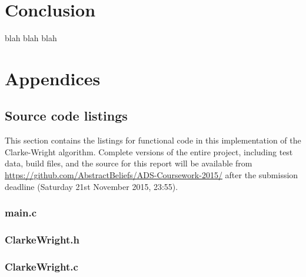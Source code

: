 \documentclass[a4paper]{article}
\begin{document}
    \section{Conclusion}
    blah blah blah

    
    
    
    \section{Appendices}
        \subsection{Source code listings}
            This section contains the listings for functional code in this implementation of the Clarke-Wright algorithm.
            Complete versions of the entire project, including test data, build files, and the source for this report will be available from
            \url{https://github.com/AbstractBeliefs/ADS-Coursework-2015/} after the submission deadline (Saturday 21st November 2015, 23:55).
            \subsubsection{main.c}
                
            \subsubsection{ClarkeWright.h}
                
            \subsubsection{ClarkeWright.c}
                
\end{document}
